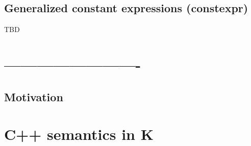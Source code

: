 \documentclass{fithesis3}
\begin{document}





\section{Generalized constant expressions (constexpr)}
TBD


\ifshowoldstuff

\chapter{-------------------------}

\section{Motivation}



\chapter{C++ semantics in K}


\end{document}
